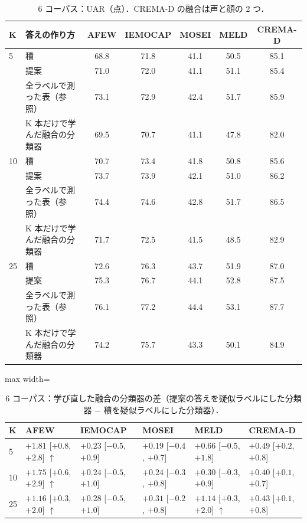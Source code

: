 \begin{table}[H]\centering\small
\caption{6 コーパス：UAR（点）．CREMA-D の融合は声と顔の 2 つ．}
\begin{tabular}{llccccc}
\toprule
K & 答えの作り方 & AFEW & IEMOCAP & MOSEI & MELD & CREMA-D \\
\midrule
5 & 積 & 68.8 & 71.8 & 41.1 & 50.5 & 85.1 \\
 & 提案 & 71.0 & 72.0 & 41.1 & 51.1 & 85.4 \\
 & 全ラベルで測った表（参照） & 73.1 & 72.9 & 42.4 & 51.7 & 85.9 \\
 & K 本だけで学んだ融合の分類器 & 69.5 & 70.7 & 41.1 & 47.8 & 82.0 \\
\midrule
10 & 積 & 70.7 & 73.4 & 41.8 & 50.8 & 85.6 \\
 & 提案 & 73.7 & 73.9 & 42.1 & 51.0 & 86.2 \\
 & 全ラベルで測った表（参照） & 74.4 & 74.6 & 42.8 & 51.7 & 86.5 \\
 & K 本だけで学んだ融合の分類器 & 71.7 & 72.5 & 41.5 & 48.5 & 82.9 \\
\midrule
25 & 積 & 72.6 & 76.3 & 43.7 & 51.9 & 87.0 \\
 & 提案 & 75.3 & 76.7 & 44.1 & 52.8 & 87.5 \\
 & 全ラベルで測った表（参照） & 76.1 & 77.2 & 44.4 & 53.1 & 87.7 \\
 & K 本だけで学んだ融合の分類器 & 74.2 & 75.7 & 43.3 & 50.1 & 84.9 \\
\bottomrule
\end{tabular}
\end{table}

\begin{table}[H]\centering\small
\caption{6 コーパス：学び直した融合の分類器の差（提案の答えを疑似ラベルにした分類器 − 積を疑似ラベルにした分類器）．}
\setlength{\tabcolsep}{5pt}
\begin{adjustbox}{max width=\linewidth}
\begin{tabular}{llllll}
\toprule
K & AFEW & IEMOCAP & MOSEI & MELD & CREMA-D \\
\midrule
5 & \textbf{$+1.81$} {\scriptsize[$+0.8$, $+2.8$]} $\uparrow$ & $+0.23$ {\scriptsize[$-0.5$, $+0.9$]} & $+0.19$ {\scriptsize[$-0.4$, $+0.7$]} & $+0.66$ {\scriptsize[$-0.5$, $+1.8$]} & $+0.49$ {\scriptsize[$+0.2$, $+0.8$]} \\
10 & \textbf{$+1.75$} {\scriptsize[$+0.6$, $+2.9$]} $\uparrow$ & $+0.24$ {\scriptsize[$-0.5$, $+1.0$]} & $+0.24$ {\scriptsize[$-0.3$, $+0.8$]} & $+0.30$ {\scriptsize[$-0.3$, $+0.9$]} & $+0.40$ {\scriptsize[$+0.1$, $+0.7$]} \\
25 & \textbf{$+1.16$} {\scriptsize[$+0.3$, $+2.0$]} $\uparrow$ & $+0.28$ {\scriptsize[$-0.5$, $+1.0$]} & $+0.31$ {\scriptsize[$-0.2$, $+0.8$]} & \textbf{$+1.14$} {\scriptsize[$+0.3$, $+2.0$]} $\uparrow$ & $+0.43$ {\scriptsize[$+0.1$, $+0.8$]} \\
\bottomrule
\end{tabular}
\end{adjustbox}
\end{table}
